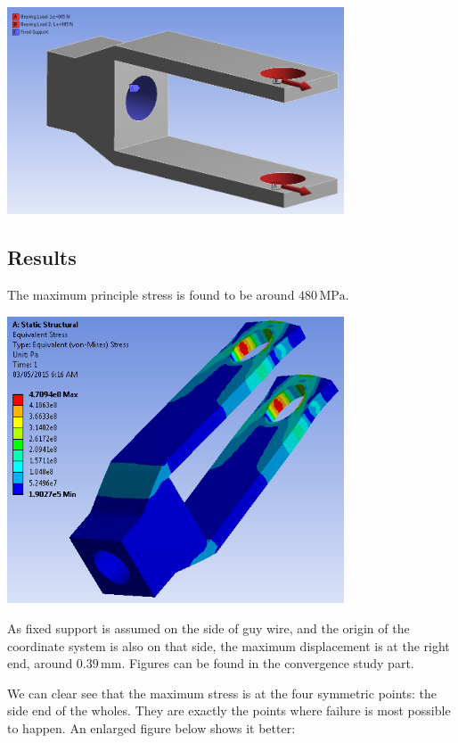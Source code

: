 \documentclass[a4paper,14pt]{extarticle}
\begin{document}
\begin{center}\includegraphics[width=0.75\textwidth]{Model.PNG}\end{center}
\subsection{Results}
The maximum principle stress is found to be around $480\,\si{\mega\pascal}$.

\begin{center}\includegraphics[width=0.75\textwidth]{STRESS_DEFAULT.PNG}\end{center}

As fixed support is assumed on the side of guy wire, and the origin of the coordinate system is also on that side, the maximum displacement is at the right end, around $0.39\,\si{\milli\meter}$. Figures can be found in the convergence study part.

We can clear see that the maximum stress is at the four symmetric points: the side end of the wholes. They are exactly the points where failure is most possible to happen.  An enlarged figure below shows it better:
\end{document}
